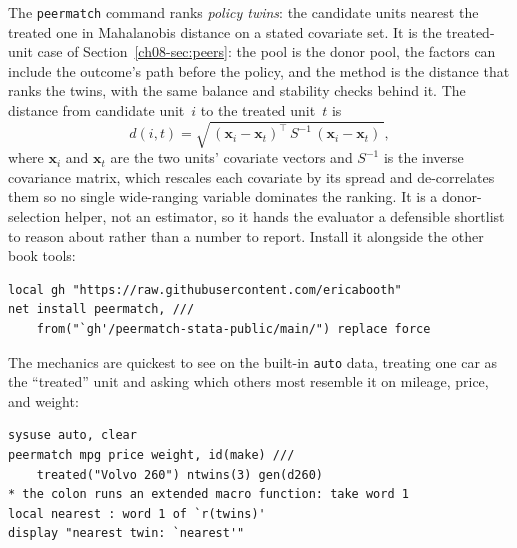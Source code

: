 The \texttt{peermatch} command ranks \emph{policy twins}: the candidate units nearest the treated one in Mahalanobis distance on a stated covariate set. It is the treated-unit case of Section~\ref{ch08-sec:peers}: the pool is the donor pool, the factors can include the outcome's path before the policy, and the method is the distance that ranks the twins, with the same balance and stability checks behind it. The distance from candidate unit~$i$ to the treated unit~$t$ is
\[
d(i,t)=\sqrt{\,(\mathbf{x}_i-\mathbf{x}_t)^{\!\top}\,S^{-1}\,(\mathbf{x}_i-\mathbf{x}_t)\,},
\]
where $\mathbf{x}_i$ and $\mathbf{x}_t$ are the two units' covariate vectors and $S^{-1}$ is the inverse covariance matrix, which rescales each covariate by its spread and de-correlates them so no single wide-ranging variable dominates the ranking. It is a donor-selection helper, not an estimator, so it hands the evaluator a defensible shortlist to reason about rather than a number to report. Install it alongside the other book tools:
\par
{\footnotesize
\begin{verbatim}
local gh "https://raw.githubusercontent.com/ericabooth"
net install peermatch, ///
    from("`gh'/peermatch-stata-public/main/") replace force
\end{verbatim}
}
The mechanics are quickest to see on the built-in \texttt{auto} data, treating one car as the \enquote{treated} unit and asking which others most resemble it on mileage, price, and weight:
\par
{\footnotesize
\begin{verbatim}
sysuse auto, clear
peermatch mpg price weight, id(make) ///
    treated("Volvo 260") ntwins(3) gen(d260)
* the colon runs an extended macro function: take word 1
local nearest : word 1 of `r(twins)'
display "nearest twin: `nearest'"
\end{verbatim}
}
